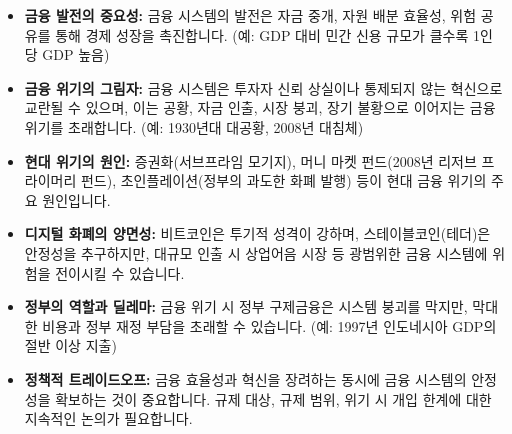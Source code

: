 \documentclass[11pt,a4paper]{article}
\theoremstyle{definition}
\begin{document}
\newpage

\begin{tcolorbox}[title=\textbf{빠르게 훑어보기: Module 1 핵심 요약}]
\begin{itemize}
    \item \textbf{금융 발전의 중요성:} 금융 시스템의 발전은 자금 중개, 자원 배분 효율성, 위험 공유를 통해 경제 성장을 촉진합니다. (예: GDP 대비 민간 신용 규모가 클수록 1인당 GDP 높음)
    \item \textbf{금융 위기의 그림자:} 금융 시스템은 투자자 신뢰 상실이나 통제되지 않는 혁신으로 교란될 수 있으며, 이는 공황, 자금 인출, 시장 붕괴, 장기 불황으로 이어지는 금융 위기를 초래합니다. (예: 1930년대 대공황, 2008년 대침체)
    \item \textbf{현대 위기의 원인:} 증권화(서브프라임 모기지), 머니 마켓 펀드(2008년 리저브 프라이머리 펀드), 초인플레이션(정부의 과도한 화폐 발행) 등이 현대 금융 위기의 주요 원인입니다.
    \item \textbf{디지털 화폐의 양면성:} 비트코인은 투기적 성격이 강하며, 스테이블코인(테더)은 안정성을 추구하지만, 대규모 인출 시 상업어음 시장 등 광범위한 금융 시스템에 위험을 전이시킬 수 있습니다.
    \item \textbf{정부의 역할과 딜레마:} 금융 위기 시 정부 구제금융은 시스템 붕괴를 막지만, 막대한 비용과 정부 재정 부담을 초래할 수 있습니다. (예: 1997년 인도네시아 GDP의 절반 이상 지출)
    \item \textbf{정책적 트레이드오프:} 금융 효율성과 혁신을 장려하는 동시에 금융 시스템의 안정성을 확보하는 것이 중요합니다. 규제 대상, 규제 범위, 위기 시 개입 한계에 대한 지속적인 논의가 필요합니다.
\end{itemize}
\end{tcolorbox}
\end{document}
